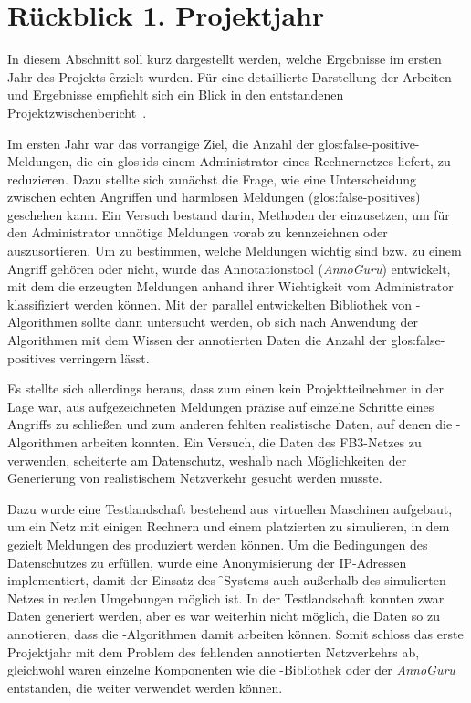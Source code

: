 \section{Rückblick 1. Projektjahr}
\label{sec:intro:retro}

\authors{\JF \and \DH}{\LM \and \MW \and \BK}

In diesem Abschnitt soll kurz dargestellt werden, welche Ergebnisse im
ersten Jahr des Projekts \f erzielt wurden. Für eine detaillierte
Darstellung der Arbeiten und Ergebnisse empfiehlt sich ein Blick in
den entstandenen Projektzwischenbericht~\cite{fidius}.

Im ersten Jahr war das vorrangige Ziel, die Anzahl der
\gls{glos:false-positive}-Meldungen, die ein \gls{glos:ids} einem
Administrator eines Rechnernetzes liefert, zu reduzieren. Dazu stellte
sich zunächst die Frage, wie eine Unterscheidung zwischen echten
Angriffen und harmlosen Meldungen (\glspl{glos:false-positive})
geschehen kann. Ein Versuch bestand darin, Methoden der 
einzusetzen, um für den Administrator unnötige Meldungen vorab zu
kennzeichnen oder auszusortieren. Um zu bestimmen, welche Meldungen
wichtig sind bzw. zu einem Angriff gehören oder nicht, wurde das
Annotationstool (\textit{AnnoGuru}) entwickelt, mit dem die erzeugten
Meldungen anhand ihrer Wichtigkeit vom Administrator klassifiziert
werden können. Mit der parallel entwickelten Bibliothek von
-Algorithmen sollte dann untersucht werden, ob sich nach
Anwendung der Algorithmen mit dem Wissen der annotierten Daten die
Anzahl der \glspl{glos:false-positive} verringern lässt.

Es stellte sich allerdings heraus, dass zum einen kein
Projektteilnehmer in der Lage war, aus aufgezeichneten Meldungen
präzise auf einzelne Schritte eines Angriffs zu schließen und zum
anderen fehlten re\-a\-lis\-tische Daten, auf denen die
-Algorithmen arbeiten konnten. Ein Versuch, die Daten des
FB3-Netzes zu verwenden, scheiterte am Datenschutz, weshalb nach
Möglichkeiten der Generierung von realistischem Netzverkehr gesucht
werden musste.

Dazu wurde eine Testlandschaft bestehend aus virtuellen Maschinen
aufgebaut, um ein Netz mit einigen Rechnern und einem platzierten
 zu simulieren, in dem gezielt Meldungen des 
produziert werden können. Um die Bedingungen des Datenschutzes zu
erfüllen, wurde eine Anonymisierung der IP-Adressen implementiert,
damit der Einsatz des \f-Systems auch außerhalb des simulierten
Netzes in realen Umgebungen möglich ist. In der Testlandschaft konnten
zwar Daten generiert werden, aber es war weiterhin nicht möglich, die
Daten so zu annotieren, dass die -Algorithmen damit arbeiten
können.  Somit schloss das erste Projektjahr mit dem Problem des
fehlenden annotierten Netzverkehrs ab, gleichwohl waren
einzelne Komponenten wie die -Bibliothek oder der
\textit{AnnoGuru} entstanden, die weiter verwendet werden können.

